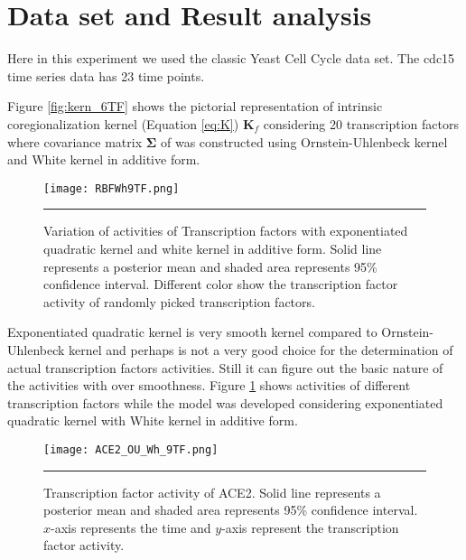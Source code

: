 \section{Data set and Result analysis} %
Here in this experiment we used the classic \cite{Spellman:1998} Yeast Cell Cycle data set. The cdc15 time series data has 23 time points. 

Figure \ref{fig:kern_6TF} shows the pictorial representation of intrinsic coregionalization kernel (Equation \ref{eq:K}) $\textbf{K}_f$ considering 20 transcription factors where covariance matrix $\boldsymbol{\Sigma}$ of  was constructed using Ornstein-Uhlenbeck kernel and White kernel in additive form.

\begin{figure}[t]
	\centering
		\texttt{[image: RBFWh9TF.png]}
		\rule{35em}{0.5pt}
	\caption[Variation of activities of Transcription factors with exponentiated quadratic kernel and  white kernel in additive form] {Variation of activities of Transcription factors with exponentiated quadratic kernel and  white kernel in additive form. Solid line represents a posterior mean and shaded area represents 95\% confidence interval. Different color show the transcription factor activity of randomly picked transcription factors.}
	\label{fig:TFA_with_RBFnWhKernel}
\end{figure}

Exponentiated quadratic kernel is very smooth kernel compared to Ornstein-Uhlenbeck kernel and perhaps is not a very good choice for the determination of actual transcription factors activities. Still it can figure out the basic nature of the activities with over smoothness. Figure \ref{fig:TFA_with_RBFnWhKernel} shows activities of different transcription factors while the model was developed considering exponentiated quadratic kernel with White kernel in additive form.

\begin{figure}[t]
	\centering
		\texttt{[image: ACE2\_OU\_Wh\_9TF.png]}
		\rule{35em}{0.5pt}
	\caption[Transcription factor activity of ACE2]
		{Transcription factor activity of ACE2. Solid line represents a posterior mean and shaded area represents 95\% confidence interval. $x$-axis represents the time and $y$-axis represent the transcription factor activity.}
	\label{fig:TFA_of_of_ACE2}
\end{figure}

